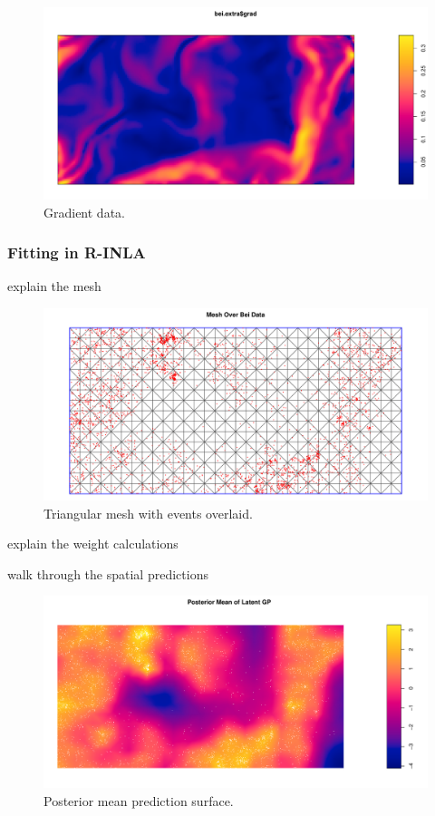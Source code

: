 \documentclass[]{interact}
\begin{document}
\begin{figure}[h]
\includegraphics[width=\textwidth]{figures/beigrad.pdf}
\caption{Gradient data.}
\label{beigrad}
\end{figure}


\subsubsection{Fitting in R-INLA}

explain the mesh

\begin{figure}[h]
\includegraphics[width=\textwidth]{figures/beimesh.pdf}
\caption{Triangular mesh with events overlaid.}
\label{beimesh}
\end{figure}

explain the weight calculations

walk through the spatial predictions

\begin{figure}[h]
\includegraphics[width=\textwidth]{figures/beimean.pdf}
\caption{Posterior mean prediction surface.}
\label{beimean}
\end{figure}
\end{document}
